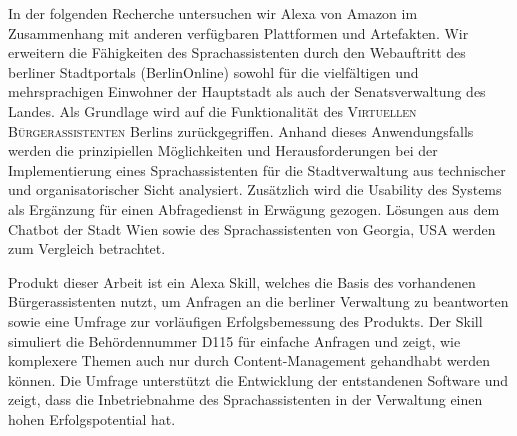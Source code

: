 In der folgenden Recherche untersuchen wir Alexa von Amazon im Zusammenhang mit anderen verfügbaren Plattformen und Artefakten. Wir erweitern die Fähigkeiten des Sprachassistenten durch den Webauftritt des berliner Stadtportals (BerlinOnline) %
sowohl für die vielfältigen und mehrsprachigen Einwohner der Hauptstadt als auch der Senatsverwaltung des Landes. Als Grundlage wird auf die Funktionalität des  %
	\textsc{Virtuellen Bürgerassistenten} Berlins
zurückgegriffen. Anhand dieses Anwendungsfalls werden die prinzipiellen Möglichkeiten und Herausforderungen bei der Implementierung eines Sprachassistenten für die Stadtverwaltung aus technischer und organisatorischer Sicht analysiert. Zusätzlich wird die Usability des Systems als Ergänzung für einen Abfragedienst in Erwägung gezogen. %
Lösungen aus dem Chatbot der Stadt Wien sowie des Sprachassistenten von Georgia, USA werden zum Vergleich betrachtet.


Produkt dieser Arbeit ist ein Alexa Skill, welches die Basis des vorhandenen Bürgerassistenten %
nutzt, um Anfragen an die berliner Verwaltung zu beantworten sowie eine Umfrage zur vorläufigen Erfolgsbemessung des Produkts. Der Skill simuliert die Behördennummer D115 für einfache Anfragen und zeigt, wie komplexere Themen auch nur durch Content-Management gehandhabt werden können. Die Umfrage unterstützt die Entwicklung der entstandenen Software und zeigt, dass die Inbetriebnahme %
des Sprachassistenten in der Verwaltung einen hohen Erfolgspotential hat. %









